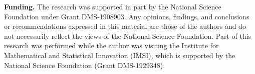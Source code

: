 \documentclass[11pt, oneside]{article}   	%
\theoremstyle{plain}
\theoremstyle{definition}
\theoremstyle{remark}
\begin{document}
\textbf{Funding.} The research was supported in part by the National Science Foundation under Grant DMS-1908903. Any opinions, findings, and conclusions or recommendations expressed in this material are those of the authors and do not necessarily reflect the views of the National Science Foundation. Part of this research was performed while the author was visiting the Institute for Mathematical and Statistical Innovation (IMSI), which is supported by the National Science Foundation (Grant DMS-1929348).






\footnotesize

\end{document}

